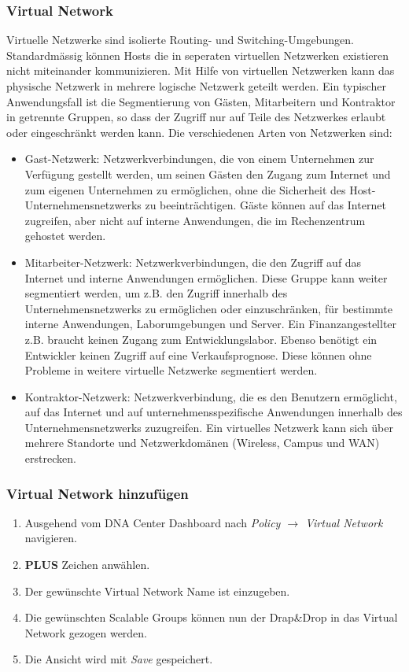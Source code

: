 \subsubsection{Virtual Network}
Virtuelle Netzwerke sind isolierte Routing- und Switching-Umgebungen. Standardmässig können Hosts die in seperaten virtuellen Netzwerken existieren nicht miteinander kommunizieren. Mit Hilfe von virtuellen Netzwerken kann das physische Netzwerk in mehrere logische Netzwerk geteilt werden. Ein typischer Anwendungsfall ist die Segmentierung von Gästen, Mitarbeitern und Kontraktor in getrennte Gruppen, so dass der Zugriff nur auf Teile des Netzwerkes erlaubt oder eingeschränkt werden kann. Die verschiedenen Arten von Netzwerken sind:

\begin{itemize}
	\item Gast-Netzwerk: Netzwerkverbindungen, die von einem Unternehmen zur Verfügung gestellt werden, um seinen Gästen den Zugang zum Internet und zum eigenen Unternehmen zu ermöglichen, ohne die Sicherheit des Host-Unternehmensnetzwerks zu beeinträchtigen. Gäste können auf das Internet zugreifen, aber nicht auf interne Anwendungen, die im Rechenzentrum gehostet werden.
	\item Mitarbeiter-Netzwerk: Netzwerkverbindungen, die den Zugriff auf das Internet und interne Anwendungen ermöglichen. Diese Gruppe kann weiter segmentiert werden, um z.B. den Zugriff innerhalb des Unternehmensnetzwerks zu ermöglichen oder einzuschränken, für bestimmte interne Anwendungen, Laborumgebungen und Server. Ein Finanzangestellter z.B. braucht keinen Zugang zum Entwicklungslabor. Ebenso benötigt ein Entwickler keinen Zugriff auf eine Verkaufsprognose. Diese können ohne Probleme in weitere virtuelle Netzwerke segmentiert werden.
	\item Kontraktor-Netzwerk: Netzwerkverbindung, die es den Benutzern ermöglicht, auf das Internet und auf unternehmensspezifische Anwendungen innerhalb des Unternehmensnetzwerks zuzugreifen. Ein virtuelles Netzwerk kann sich über mehrere Standorte und Netzwerkdomänen (Wireless, Campus und WAN) erstrecken.
\end{itemize}

\subsubsection{Virtual Network hinzufügen}
\begin{enumerate}
	\item Ausgehend vom DNA Center Dashboard nach \textit{Policy $\rightarrow$ Virtual Network} navigieren. 
	\item \textbf{PLUS} Zeichen anwählen.
	\item Der gewünschte Virtual Network Name ist einzugeben.
	\item Die gewünschten Scalable Groups können nun der Drap\&Drop in das Virtual Network gezogen werden.
	\item Die Ansicht wird mit \textit{Save} gespeichert.
\end{enumerate}

